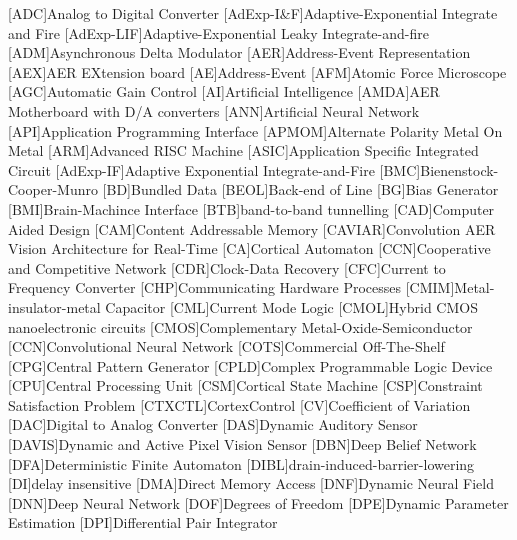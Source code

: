 \begin{acronym}
[ADC]{Analog to Digital Converter}
[AdExp-I\&F]{Adaptive-Exponential Integrate and Fire}
[AdExp-LIF]{Adaptive-Exponential Leaky Integrate-and-fire}
[ADM]{Asynchronous Delta Modulator}
[AER]{Address-Event Representation}
[AEX]{AER EXtension board}
[AE]{Address-Event}
[AFM]{Atomic Force Microscope}
[AGC]{Automatic Gain Control}
[AI]{Artificial Intelligence}
[AMDA]{AER Motherboard with D/A converters}
[ANN]{Artificial Neural Network}
[API]{Application Programming Interface}
[APMOM]{Alternate Polarity Metal On Metal}
[ARM]{Advanced RISC Machine}
[ASIC]{Application Specific Integrated Circuit}
[AdExp-IF]{Adaptive Exponential Integrate-and-Fire}
[BMC]{Bienenstock-Cooper-Munro}
[BD]{Bundled Data}
[BEOL]{Back-end of Line}
[BG]{Bias Generator}
[BMI]{Brain-Machince Interface}
[BTB]{band-to-band tunnelling}
[CAD]{Computer Aided Design}
[CAM]{Content Addressable Memory}
[CAVIAR]{Convolution AER Vision Architecture for Real-Time}
[CA]{Cortical Automaton}
[CCN]{Cooperative and Competitive Network}
[CDR]{Clock-Data Recovery}
[CFC]{Current to Frequency Converter}
[CHP]{Communicating Hardware Processes}
[CMIM]{Metal-insulator-metal Capacitor}
[CML]{Current Mode Logic}
[CMOL]{Hybrid CMOS nanoelectronic circuits}
[CMOS]{Complementary Metal-Oxide-Semiconductor}
[CCN]{Convolutional Neural Network}
[COTS]{Commercial Off-The-Shelf}
[CPG]{Central Pattern Generator}
[CPLD]{Complex Programmable Logic Device}
[CPU]{Central Processing Unit}
[CSM]{Cortical State Machine}
[CSP]{Constraint Satisfaction Problem}
[CTXCTL]{CortexControl}
[CV]{Coefficient of Variation}
[DAC]{Digital to Analog Converter}
[DAS]{Dynamic Auditory Sensor}
[DAVIS]{Dynamic and Active Pixel Vision Sensor}
[DBN]{Deep Belief Network}
[DFA]{Deterministic Finite Automaton}
[DIBL]{drain-induced-barrier-lowering}
[DI]{delay insensitive}
[DMA]{Direct Memory Access}
[DNF]{Dynamic Neural Field}
[DNN]{Deep Neural Network}
[DOF]{Degrees of Freedom}
[DPE]{Dynamic Parameter Estimation}
[DPI]{Differential Pair Integrator}

\end{acronym}
